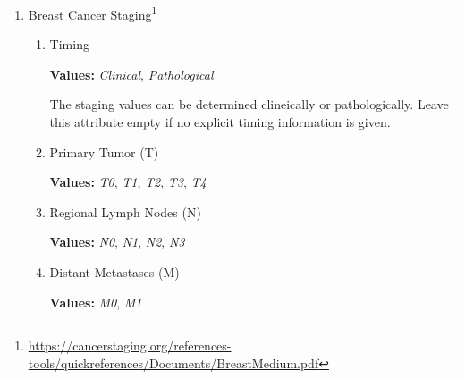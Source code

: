 \documentclass[letterpaper]{article}
\newcommand{\prefixDeep}[3]{%
  #1 %
  \tikz[baseline={([yshift={-\ht\strutbox}]a\x.north)},outer sep=0pt,inner sep=0pt]{%
    \node[align=center] (a\x) {%
      \strut \hl{#2}};%
  } %
  #3
}
\newcommand{\suffixDeep}{%
  \tikz[overlay]{ \draw[<->,thick] (b\x.west) -| (a\x.south); }%
  \pgfmathparse{int(\x+1)}%
  \xdef\x{\pgfmathresult}%
}
\newcommand{\threeDeep}[6]{%
  \begin{flushright}
  \tikz{
    \node[attrbox,align=right] (b\x) {%
      #1:  #2\\%
      #3:  #4\\%
      #5:  #6%
    };%
  }
  \end{flushright}
  \suffixDeep
}
\newcommand{\fiveDeep}[9]{%
  \begin{flushright}
  \tikz{
    \node[attrbox,align=right] (b\x) {%
      #1:  #2\\%
      #3:  #4\\%
      #5:  #6\\%
      #7:  #8\\%
      Historical:  #9%
    };%
  }
  \end{flushright}
  \suffixDeep
}
\newcommand{\erStatus}[5]{\fiveDeep{ER Status}{#1}{ER Positivity}{#2}{Allred Status}{#3}{Allred Score}{#4}{#5}}
\newcommand{\prStatus}[5]{\fiveDeep{PR Status}{#1}{PR Positivity}{#2}{Allred Status}{#3}{Allred Score}{#4}{#5}}
\newcommand{\herStatus}[3]{\threeDeep{HER2 Status}{#1}{HER2 Positivity}{#2}{Historical}{#3}}%
\begin{document}
\begin{enumerate}
  
\item
  Breast Cancer Staging\footnote{\url{https://cancerstaging.org/references-tools/quickreferences/Documents/BreastMedium.pdf}}

  \begin{enumerate}
  \item
    Timing

    \textbf{Values:}  \textsl{Clinical}, \textsl{Pathological}

    The staging values can be determined clineically or pathologically.
    Leave this attribute empty if no explicit timing information is given.
    
  \item
    Primary Tumor (T)

    \textbf{Values:}  \textsl{T0}, \textsl{T1}, \textsl{T2}, \textsl{T3}, \textsl{T4}
    
  \item
    Regional Lymph Nodes (N)

    \textbf{Values:}  \textsl{N0}, \textsl{N1}, \textsl{N2}, \textsl{N3}

  \item
    Distant Metastases (M)

    \textbf{Values:}  \textsl{M0}, \textsl{M1}
    

\end{enumerate}
\end{enumerate}
\end{document}
